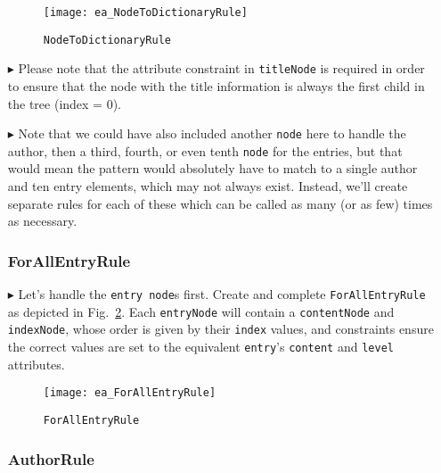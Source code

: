\begin{itemize}
\begin{figure}[htbp]
  \hspace{-0.7cm}
  \texttt{[image: ea\_NodeToDictionaryRule]}
  \caption{\texttt{NodeToDictionaryRule} \update}
  \label{ea:NodeToDictionary_Complete}
\end{figure}

\item[$\blacktriangleright$] Please note that the attribute constraint in \texttt{titleNode} is required in order to ensure that the node
with the title information is always the first child in the tree (index = 0). 

\item[$\blacktriangleright$] Note that we could have also included another \texttt{node} here to handle the author, then a third, fourth, or even tenth
\texttt{node} for the entries, but that would mean the pattern would absolutely have to match to a single author and ten entry elements, which
may not always exist. Instead, we'll create separate rules for each of these which can be called as many (or as few) times as necessary.

\subsubsection{ForAllEntryRule} %

\item[$\blacktriangleright$] Let's handle the \texttt{entry node}s first. Create and complete \texttt{For\-All\-Ent\-ry\-Rule} as depicted in
Fig.~\ref{ea:ForAllEntry_Complete}. Each \texttt{entryNode} will contain a \texttt{contentNode} and \texttt{indexNode}, whose order is given by their
\texttt{index} values, and constraints ensure the correct values are set to the equivalent \texttt{entry}'s \texttt{content} and \texttt{level} attributes.

\vspace{0.5cm}

\begin{figure}[htbp]
\begin{center}
  \texttt{[image: ea\_ForAllEntryRule]}
  \caption{\texttt{ForAllEntryRule}}
  \label{ea:ForAllEntry_Complete}
\end{center}
\end{figure}

\subsubsection{AuthorRule} %


\end{itemize}
